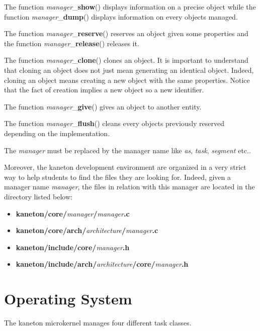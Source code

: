 The function \textit{manager}\_\textbf{show}() displays information
on a precise object while the function \textit{manager}\_\textbf{dump}()
displays information on every objects managed.

The function \textit{manager}\_\textbf{reserve}() reserves an object
given some properties and the function \textit{manager}\_\textbf{release}()
releases it.

The function \textit{manager}\_\textbf{clone}() clones an object. It is
important to understand that cloning an object does not just mean
generating an identical object. Indeed, cloning an object means creating
a new object with the same properties. Notice that the fact of creation
implies a new object so a new identifier.

The function \textit{manager}\_\textbf{give}() gives an object to another
entity.

The function \textit{manager}\_\textbf{flush}() cleans every objects
previously reserved depending on the implementation.

The \textit{manager} must be replaced by the manager name like \textit{as},
\textit{task}, \textit{segment} etc..

Moreover, the kaneton development environment are organized in a very
strict way to help students to find the files they are looking for. Indeed,
given a manager name \textit{manager}, the files in relation with this
manager are located in the directory listed below:

\begin{itemize}
  \item
    \textbf{kaneton/core/}\textit{manager}\textbf{/}\textit{manager}\textbf{.c}
  \item
    \textbf{kaneton/core/arch/}\textit{architecture}\textbf{/}\textit{manager}\textbf{.c}
  \item
    \textbf{kaneton/include/core/}\textit{manager}\textbf{.h}
  \item
    \textbf{kaneton/include/arch/}\textit{architecture}\textbf{/core/}\textit{manager}\textbf{.h}
\end{itemize}

%
%

\section{Operating System}

The kaneton microkernel manages four different task classes.

